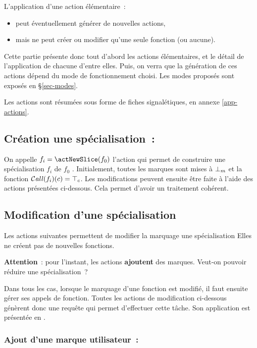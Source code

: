 L'application d'une action élémentaire~:
\begin{itemize}
  \item peut éventuellement générer de nouvelles actions,
  \item mais ne peut créer ou modifier qu'une seule fonction (ou aucune).
\end{itemize}
\bb

Cette partie présente donc tout d'abord les actions élémentaires,
et le détail de l'application de chacune d'entre elles.
Puis, on verra que la génération de ces actions dépend du mode de fonctionnement
choisi. Les modes proposés sont exposés en \S\ref{sec-modes}.

Les actions sont résumées sous forme de fiches signalétiques, en annexe
\ref{app-actions}.

\subsection{Création une spécialisation~: \actNewSlice}

On appelle $f_i = \actNewSlice(f_0)$ l'action qui permet de construire
une spécialisation $f_i$ de $f_0$ . Initialement, toutes les marques sont
mises à ${\bot}_m$ et la fonction $\operatorname{\mathcal{C\mathit{all}}}(f_i)(c) = {\top}_c$.
Les modifications peuvent ensuite être faite à l'aide des actions présentées
ci-dessous. Cela permet d'avoir un traitement cohérent.

\subsection{Modification d'une spécialisation}

Les actions suivantes permettent de modifier la marquage une spécialisation 
Elles ne créent pas de nouvelles fonctions.
\bb

{\bf Attention}~: pour l'instant, les actions {\bf ajoutent} des marques.
Veut-on pouvoir réduire une spécialisation~?

Dans tous les cas, lorsque le marquage d'une fonction est modifié,
il faut ensuite gérer ses appels de fonction.
Toutes les actions de modification ci-dessous génèrent donc une requête 
\actExamineCalls{} qui permet d'effectuer cette tâche.
Son application est présentée en .

\subsubsection{Ajout d'une marque utilisateur~: \actAddUserMark}

